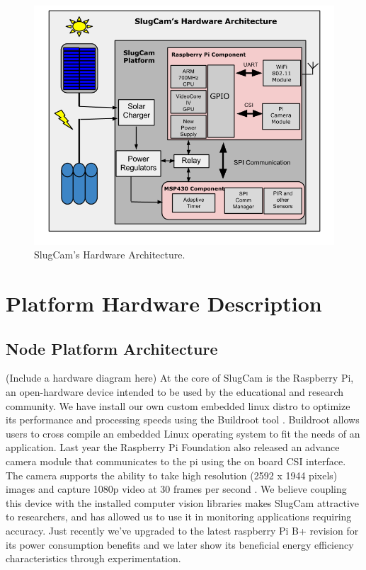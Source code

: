 \documentclass[10pt,conference]{IEEEtran}
\begin{document}
\begin{figure}[h!]
\centering
\includegraphics[scale=0.35]{SlugCam_Hardware_Architecture_Diagram.png}
\caption{SlugCam's Hardware Architecture. }
\end{figure}	


\section{Platform Hardware Description}

\subsection{ Node Platform Architecture} (Include a hardware diagram here)
At the core of SlugCam is the Raspberry Pi, an open-hardware device intended to be used by the educational and research community. We have install our own custom embedded linux distro to optimize its performance and processing speeds using the Buildroot tool \cite{buildroot}. Buildroot allows users to cross compile an embedded Linux operating system to fit the needs of an application. Last year the Raspberry Pi Foundation also released an advance camera module that communicates to the pi using the on board CSI interface. The camera supports the ability to take high resolution (2592 x 1944 pixels) images and capture 1080p video at 30 frames per second \cite{rpicamera}. We believe coupling this device with the installed computer vision libraries makes SlugCam attractive to researchers, and has allowed us to use it in monitoring applications requiring accuracy. Just recently we've upgraded to the latest raspberry Pi B+ revision for its power consumption benefits and we later show its beneficial energy efficiency characteristics through experimentation.
\end{document}
